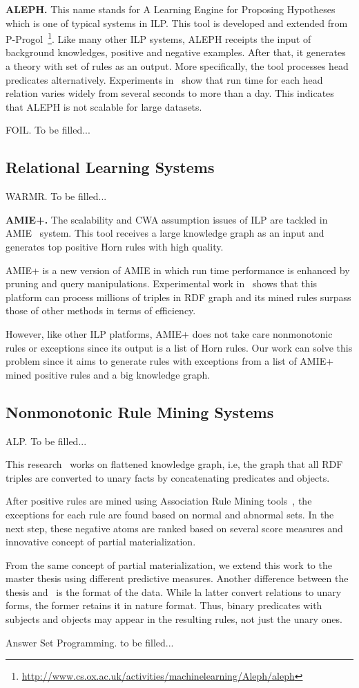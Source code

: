 \textbf{ALEPH.} This name stands for A Learning Engine for Proposing Hypotheses which is one of typical systems in ILP. This tool is developed and extended from P-Progol~\footnote{\url{http://www.cs.ox.ac.uk/activities/machinelearning/Aleph/aleph}}. Like many other ILP systems, ALEPH receipts the input of background knowledges, positive and negative examples. After that, it generates a theory with set of rules as an output. More specifically, the tool processes head predicates alternatively. Experiments in~\cite{ref10} show that run time for each head relation varies widely from several seconds to more than a day. This indicates that ALEPH is not scalable for large datasets.

FOIL. To be filled...

\subsection{Relational Learning Systems}

WARMR. To be filled...

\textbf{AMIE+.} The scalability and CWA assumption issues of ILP are tackled in AMIE~\cite{ref10} system. This tool receives a large knowledge graph as an input and generates top positive Horn rules with high quality.

AMIE+ is a new version of AMIE in which run time performance is enhanced by pruning and query manipulations. Experimental work in~\cite{ref10} shows that this platform can process millions of triples in RDF graph and its mined rules surpass those of other methods in terms of efficiency.

However, like other ILP platforms, AMIE+ does not take care nonmonotonic rules or exceptions since its output is a list of Horn rules. Our work can solve this problem since it aims to generate rules with exceptions from a list of AMIE+ mined positive rules and a big knowledge graph.

\subsection{Nonmonotonic Rule Mining Systems}
\label{related-work-nonmonotonic-rule-mining-systems}

ALP. To be filled...

This research~\cite{ref12} works on flattened knowledge graph, i.e, the graph that all RDF triples are converted to unary facts by concatenating predicates and objects.

After positive rules are mined using Association Rule Mining tools~\cite{ref13}, the exceptions for each rule are found based on normal and abnormal sets. In the next step, these negative atoms are ranked based on several score measures and innovative concept of partial materialization.

From the same concept of partial materialization, we extend this work to the master thesis using different predictive measures. Another difference between the thesis and~\cite{ref12} is the format of the data. While la latter convert relations to unary forms, the former retains it in nature format. Thus, binary predicates with subjects and objects may appear in the resulting rules, not just the unary ones.

Answer Set Programming. to be filled...
